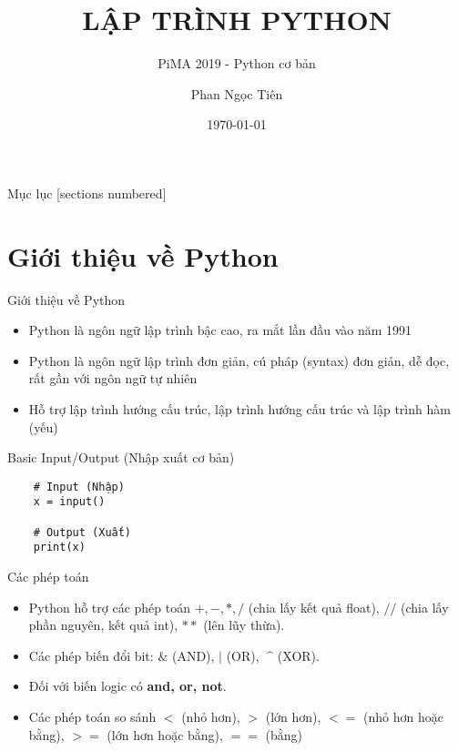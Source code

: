 \documentclass[10pt]{beamer}
\title{LẬP TRÌNH PYTHON}
\subtitle{PiMA 2019 - Python cơ bản}
\date{\today}
\date{}
\author{Phan Ngọc Tiên}
\institute{York University, Toronto, Canada}
\begin{document}
\maketitle

\begin{frame}{Mục lục}
  [sections numbered]
  \tableofcontents[hideallsubsections]
\end{frame}

\section{Giới thiệu về Python}
\begin{frame}{Giới thiệu về Python}
  \begin{itemize}
    \item Python là ngôn ngữ lập trình bậc cao, ra mắt lần đầu vào năm 1991
    \item Python là ngôn ngữ lập trình đơn giản, cú pháp (syntax) đơn giản, dễ  đọc, rất gần với ngôn ngữ tự nhiên
    \item Hỗ trợ lập trình hướng cấu trúc, lập trình hướng cấu trúc và lập trình hàm (yếu)
  \end{itemize}
\end{frame}

\begin{frame}[fragile]{Basic Input/Output (Nhập xuất cơ bản)}
  \begin{verbatim}
    # Input (Nhập)
    x = input()

    # Output (Xuất)
    print(x)
  \end{verbatim}
\end{frame}

\begin{frame}[fragile]{Các phép toán}
\begin{itemize}
  \item Python hỗ trợ các phép toán $+, -, *, /$ (chia lấy kết quả float), $//$ (chia lấy phần nguyên, kết quả int), $**$ (lên lũy thừa).

  \item Các phép biến đổi bit: $\&$ (AND), $|$ (OR), $\ \^$ (XOR).

  \item Đối với biến logic có \textbf{and, or, not}.

  \item Các phép toán so sánh $<$ (nhỏ hơn), $>$ (lớn hơn), $<=$ (nhỏ hơn hoặc bằng), $>=$ (lớn hơn hoặc bằng), $==$ (bằng)

\end{itemize}
\end{frame}
\end{document}
